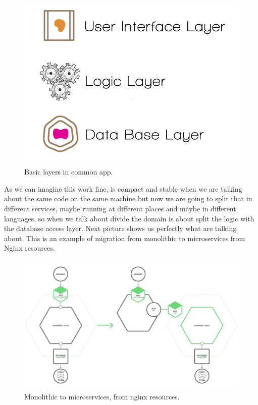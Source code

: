 \begin{figure}[H]
  \includegraphics[scale=0.25]{img/graphics/initial_microservices_distribution.png}
  \centering
  \caption{Basic layers in common app.}
\end{figure}

\noindent As we can imagine this work fine, is compact and stable when we are talking about
the same code on the same machine but now we are going to split that in
different services, maybe running at different places and maybe in different
languages, so when we talk about divide the domain is about split the logic with
the database access layer.
\intro
Next picture shows us perfectly what are talking about. This is an example
of migration from monolithic to microservices from Nginx resources.

\begin{figure}[H]
  \includegraphics[scale=0.35]{img/graphics/refactoring.png}
  \centering
  \caption{Monolithic to microservices, from nginx resources. }
\end{figure}

